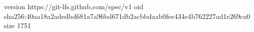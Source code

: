 version https://git-lfs.github.com/spec/v1
oid sha256:40aa18a2adedbd681a7a96bd671db2acbbdaab0fee434e4b762227ad1e269ca0
size 1751
